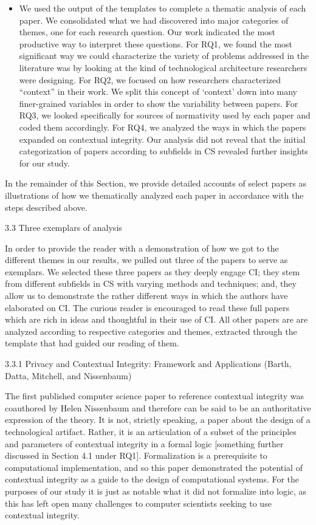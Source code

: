 \documentclass[../thesis.tex]{subfiles}
\begin{document}
\begin{itemize}
\item We used the output of the templates to complete a thematic
analysis of each paper. We consolidated what we had discovered into
major categories of themes, one for each research question. Our work
indicated the most productive way to interpret these questions. For
RQ1, we found the most significant way we could characterize the
variety of problems addressed in the literature was by looking at the
kind of technological architecture researchers were designing. For RQ2,
we focused on how researchers characterized
``context'' in their work. We split
this concept of {\textquoteleft}context' down into many
finer-grained variables in order to show the variability between
papers. For RQ3, we looked specifically for sources of normativity used
by each paper and coded them accordingly. For RQ4, we analyzed the ways
in which the papers expanded on contextual integrity. Our analysis did
not reveal that the initial categorization of papers according to
subfields in CS revealed further insights for our study.
\end{itemize}

\bigskip

In the remainder of this Section, we provide detailed accounts of select
papers as illustrations of how we thematically analyzed each paper in
accordance with the steps described above.

3.3 Three exemplars of analysis

In order to provide the reader with a demonstration of how we got to the
different themes in our results, we pulled out three of the papers to
serve as exemplars. We selected these three papers as they deeply
engage CI; they stem from different subfields in CS with varying
methods and techniques; and, they allow us to demonstrate the rather
different ways in which the authors have elaborated on CI. The curious
reader is encouraged to read these full papers which are rich in ideas
and thoughtful in their use of CI. All other papers are are analyzed
according to respective categories and themes, extracted through the
template that had guided our reading of them.

{\color[rgb]{0.2627451,0.2627451,0.2627451}
3.3.1 Privacy and Contextual Integrity: Framework and Applications
(Barth, Datta, Mitchell, and Nissenbaum)}

The first published computer science paper to reference contextual
integrity was coauthored by Helen Nissenbaum and therefore can be said
to be an authoritative expression of the theory. It is not, strictly
speaking, a paper about the design of a technological artifact. Rather,
it is an articulation of a subset of the principles and parameters of
contextual integrity in a formal logic [something further discussed in
Section 4.1 under RQ1]. Formalization is a prerequisite to
computational implementation, and so this paper demonstrated the
potential of contextual integrity as a guide to the design of
computational systems. For the purposes of our study it is just as
notable what it did not formalize into logic, as this has left open
many challenges to computer scientists seeking to use contextual
integrity.
\end{document}
